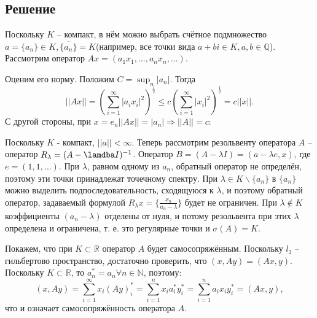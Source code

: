 \documentclass[11pt]{article}
\newcounter{th}\setcounter{th}{0}
\begin{document}
\subsection{Решение}
\label{sec:orgffbe838}
Поскольку \(K\) -- компакт, в нём можно выбрать счётное подмножество \(a = \{a_n\} \in K, \overline{\{a_n\}} = K\)(например, все точки вида \(a + bi \in K, a, b \in \mathbb{Q}\)).
Рассмотрим оператор \(Ax = (a_1x_1, \ldots, a_nx_n, \ldots)\).

Оценим его норму. Положим \(C = \sup_n |a_n|\). Тогда
\begin{equation*}
||Ax|| = \left(\sum_{i = 1}^{\infty}|a_ix_i|^2\right)^{\frac12} \leq c\left(\sum_{i = 1}^{\infty}|x_i|^2\right)^{\frac12} = c||x||.
\end{equation*}
С другой стороны, при $x = e_n ||Ax|| = |a_n| \Rightarrow ||A|| = c$:

Поскольку \(K\) - компакт, \(||a|| < \infty\). Теперь рассмотрим резольвенту оператора \(A\) -- оператор \(R_{\lambda} = (A - \lamdba I)^{-1}\). Оператор \(B = (A - \lambda I) = (a - \lambda e, x)\), где \(e = (1, 1, \ldots)\). При \(\lambda\), равном одному из \(a_n\), обратный оператор не определён, поэтому эти точки принадлежат точечному спектру. При \(\lambda \in K \backslash \{a_n\}\) в \(\{a_n\}\) можно выделить подпоследовательность, сходящуюся к \(\lambda\), и поэтому обратный оператор, задаваемый формулой \(R_{\lambda}x = \{\frac{x_n}{a_n - \lambda}\}\) будет не ограничен. При \(\lambda \notin K\) коэффициенты \((a_n - \lambda)\) отделены от нуля, и потому резольвента при этих \(\lambda\) определена и ограничена, т. е. это регулярные точки и \(\sigma(A) = K\).

Покажем, что при \(K \subset \mathbb{R}\) оператор \(A\) будет самосопряжённым. Поскольку \(l_2\) -- гильбертово пространство, достаточно проверить, что \((x, Ay) = (Ax, y)\). Поскольку \(K \subset \mathbb{R}\), то \(a_n^* = a_n \forall n \in \mathbb{N}\), поэтому:
\begin{equation*}
(x, Ay) = \sum_{i = 1}^{\infty}x_i(Ay)_i^* = \sum_{i = 1}^nx_ia_i^*y_i^* = \sum_{i = 1}^na_ix_iy_i^* = (Ax, y),
\end{equation*}
что и означает самосопряжённость оператора \(A\).
\end{document}

